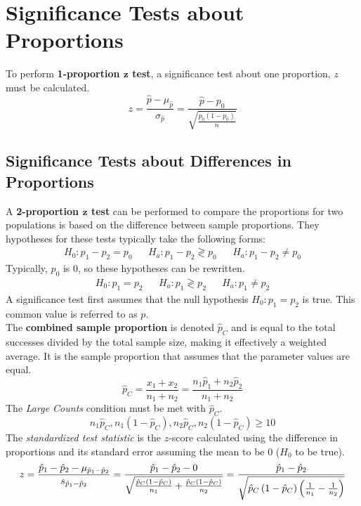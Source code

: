 \documentclass[../AP_Statistics.tex]{subfiles}
\begin{document}
		\section{Significance Tests about Proportions}
			To perform \textbf{1-proportion $\bm{z}$ test}, a significance test about one proportion, $z$ must be calculated. \\
			\[z = \frac{\hat{p} - \mu_{\hat{p}}}{\sigma_{\hat{p}}} = \frac{\hat{p} - p_0}{\sqrt{\frac{p_0(1 - p_0)}{n}}}\]			
			\subsection*{Significance Tests about Differences in Proportions}
				A \textbf{2-proportion $\bm{z}$ test} can be performed to compare the proportions for two populations is based on the difference between sample proportions. They hypotheses for these tests typically take the following forms:
				\begin{align*}
					H_0:p_1 - p_2 = p_0 && H_a: p_1 - p_2 \gtrless p_0 && H_a:p_1 - p_2 \ne p_0
				\end{align*}
				Typically, $p_0$ is 0, so these hypotheses can be rewritten.
				\begin{align*}
					H_0:p_1 = p_2 && H_a:p_1 \gtrless p_2 && H_a:p_1 \ne p_2
				\end{align*}
				A significance test first assumes that the null hypothesis $H_0:p_1 = p_2$ is true. This common value is referred to as $p$. \\
				The \textbf{combined sample proportion} is denoted $\hat{p}_C$ and is equal to the total successes divided by the total sample size, making it effectively a weighted average. It is the sample proportion that assumes that the parameter values are equal.
				\[\hat{p}_C = \frac{x_1 + x_2}{n_1 + n_2} = \frac{n_1\hat{p}_1 + n_2\hat{p}_2}{n_1 + n_2}\]
				The \emph{Large Counts} condition must be met with $\hat{p}_C$.
				\[n_1\hat{p}_C, n_1(1 - \hat{p}_C), n_2\hat{p}_C, n_2(1 - \hat{p}_C) \ge 10\]
				The \emph{standardized test statistic} is the $z$-score calculated using the difference in proportions and its standard error assuming the mean to be 0 ($H_0$ to be true).
				\[z = \frac{\hat{p}_1 - \hat{p}_2 - \mu_{\hat{p}_1 - \hat{p}_2}}{s_{\hat{p}_1 - \hat{p}_2}} = \frac{\hat{p}_1 - \hat{p}_2 - 0}{\sqrt{\frac{\hat{p}_C\left(1 - \hat{p}_C\right)}{n_1} + \frac{\hat{p}_C\left(1 - \hat{p}_C\right)}{n_2}}} = \frac{\hat{p}_1 - \hat{p}_2}{\sqrt{\hat{p}_C\left(1 - \hat{p}_C\right)\left(\frac{1}{n_1} - \frac{1}{n_2}\right)}}\]
\end{document}
